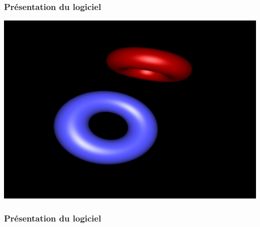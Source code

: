 \documentclass{beamer}
\begin{document}
%
\begin{frame}
\frametitle{Présentation du logiciel}

\centering
\includegraphics[scale=0.3]{logiciel1.png}
\end{frame}

%
\begin{frame}
\frametitle{Présentation du logiciel}

\centering
{}

\end{frame}
\end{document}
